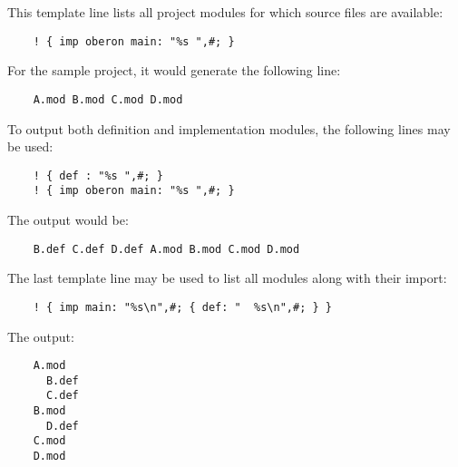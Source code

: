 This template line lists all project modules for
which source files are available:

\verb'    ! { imp oberon main: "%s ",#; }'

For the sample project, it would generate the following line:

\verb'    A.mod B.mod C.mod D.mod'

To output both definition and implementation modules, the following
lines may be used:

\verb'    ! { def : "%s ",#; }'\\
\verb'    ! { imp oberon main: "%s ",#; }'

The output would be:

\verb'    B.def C.def D.def A.mod B.mod C.mod D.mod'

The last template line may be used to list all modules
along with their import:

\verb'    ! { imp main: "%s\n",#; { def: "  %s\n",#; } }'

The output:

\begin{verbatim}
    A.mod
      B.def
      C.def
    B.mod
      D.def
    C.mod
    D.mod
\end{verbatim}
